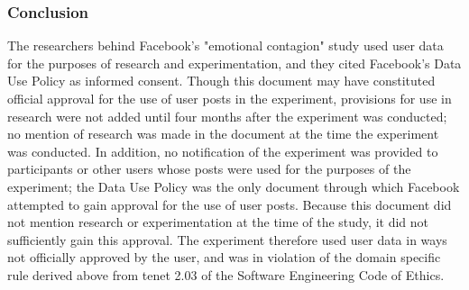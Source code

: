 \subsubsection{Conclusion}
The researchers behind Facebook's "emotional contagion" study used user data for the purposes of research and experimentation, and they cited Facebook's Data Use Policy as informed consent.  Though this document may have constituted official approval for the use of user posts in the experiment, provisions for use in research were not added until four months after the experiment was conducted; no mention of research was made in the document at the time the experiment was conducted.  In addition, no notification of the experiment was provided to participants or other users whose posts were used for the purposes of the experiment;  the Data Use Policy was the only document through which Facebook attempted to gain approval for the use of user posts.  Because this document did not mention research or experimentation at the time of the study, it did not sufficiently gain this approval.  The experiment therefore used user data in ways not officially approved by the user, and was in violation of the domain specific rule derived above from tenet 2.03 of the Software Engineering Code of Ethics.

\vspace{0.4cm}